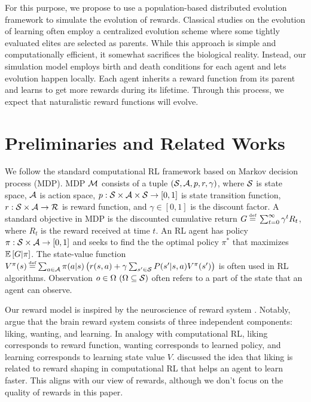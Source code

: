 For this purpose, we propose to use a population-based distributed evolution framework to simulate the evolution of rewards. Classical studies on the evolution of learning \citep{hintonHowLearningCan1987,singhWhereRewardsCome2009} often employ a centralized evolution scheme where some tightly evaluated elites are selected as parents. While this approach is simple and computationally efficient, it somewhat sacrifices the biological reality. Instead, our simulation model employs birth and death conditions for each agent and lets evolution happen locally. Each agent inherits a reward function from its parent and learns to get more rewards during its lifetime. Through this process, we expect that naturalistic reward functions will evolve.

\section{Preliminaries and Related Works}\label{sec:related}
We follow the standard computational RL framework \citep{suttonReinforcementLearningIntroduction2018} based on Markov decision process (MDP). MDP $\mathcal{M}{}$ consists of a tuple $(\mathcal{S}{}, \mathcal{A}{}, p, r, \gamma)$, where $\mathcal{S}{}$ is state space, $\mathcal{A}{}$ is action space, $p: \mathcal{S}\times\mathcal{A}\times \mathcal{S} \rightarrow [0, 1]$ is state transition function, $r: \mathcal{S}\times\mathcal{A} \rightarrow \mathcal{R}$ is reward function, and $\gamma \in [0, 1]$ is the discount factor. A standard objective in MDP is the discounted cumulative return $G \defequal{} \sum_{t=0}^{\infty}\gamma^t R_{t}$, where $R_t$ is the reward received at time $t$. An RL agent has policy $\pi: \mathcal{S} \times \mathcal{A} \rightarrow [0, 1]$ and seeks to find the the optimal policy $\pi^{*}$ that maximizes $\mathbb{E} \left[G|\pi\right]$. The state-value function $V^\pi(s) \defequal \sum_{a \in \A} \pi(a|s) \left( r(s, a) + \gamma \sum_{s' \in \X} P(s'|s, a) V^\pi(s') \right)$ is often used in RL algorithms. Observation $o \in \Omega~(\Omega \subseteq \mathcal{S})$ often refers to a part of the state that an agent can observe.

Our reward model is inspired by the neuroscience of reward system \citep{schultzNeuronalRewardDecision2015, berridgePleasureSystemsBrain2015}. Notably, \citet{berridgeDissectingComponentsReward2009} argue that the brain reward system consists of three independent components: liking, wanting, and learning. In analogy with computational RL, liking corresponds to reward function, wanting corresponds to learned policy, and learning corresponds to learning state value $V$. \citet{dayanLikingEarlyEditable2022} discussed the idea that liking is related to reward shaping \citep{ngPolicyInvarianceReward1999} in computational RL that helps an agent to learn faster. This aligns with our view of rewards, although we don't focus on the quality of rewards in this paper.

